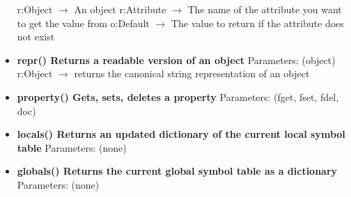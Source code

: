 \documentclass{report}
\begin{document}
\begin{itemize}
          \smallbreak \noindent
          r:Object $\rightarrow$ An object
          \smallbreak \noindent
          r:Attribute $\rightarrow$ The name of the attribute you want to get the value from
          \smallbreak \noindent
          o:Default $\rightarrow$ The value to return if the attribute does not exist
          \smallbreak \noindent
        \item[\ding{43}] \textbf{repr()	Returns a readable version of an object}
          \smallbreak \noindent
          Parameters: (object)
          \smallbreak \noindent
          r:Object $\rightarrow$ returns the canonical string representation of an object
          \smallbreak \noindent
        \item[\ding{43}] \textbf{property()	Gets, sets, deletes a property}
          \smallbreak \noindent
          Parameters: (fget, fset, fdel, doc)
        \item[\ding{43}] \textbf{locals()	Returns an updated dictionary of the current local symbol table}
          \smallbreak \noindent
          Parameters: (none)
          \smallbreak \noindent
        \item[\ding{43}] \textbf{globals()	Returns the current global symbol table as a dictionary}
          \smallbreak \noindent
          Parameters: (none)
          \smallbreak \noindent
      \end{itemize}
    
    
    \bigbreak \noindent 
    
\end{document}
